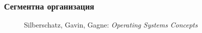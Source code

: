 \documentclass[ignorenonframetext, hyperref=unicode]{beamer}
\begin{document}
\begin{frame}
\frametitle{Сегментна организация}
\begin{figure}[h]
\center
{}
\caption{Silberschatz, Gavin, Gagne: {\em Operating Systems Concepts}}
\end{figure}
\end{frame}
\end{document}
